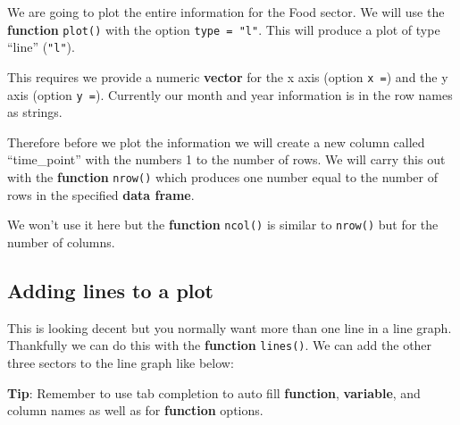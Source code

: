 \documentclass[]{book}
\newenvironment{Shaded}{\begin{snugshade}}{\end{snugshade}}
\newcommand{\KeywordTok}[1]{\textcolor[rgb]{0.13,0.29,0.53}{\textbf{#1}}}
\newcommand{\DataTypeTok}[1]{\textcolor[rgb]{0.13,0.29,0.53}{#1}}
\newcommand{\DecValTok}[1]{\textcolor[rgb]{0.00,0.00,0.81}{#1}}
\newcommand{\StringTok}[1]{\textcolor[rgb]{0.31,0.60,0.02}{#1}}
\newcommand{\CommentTok}[1]{\textcolor[rgb]{0.56,0.35,0.01}{\textit{#1}}}
\newcommand{\OperatorTok}[1]{\textcolor[rgb]{0.81,0.36,0.00}{\textbf{#1}}}
\newcommand{\NormalTok}[1]{#1}
\begin{document}
We are going to plot the entire information for the Food sector. We will
use the \textbf{function} \texttt{plot()} with the option
\texttt{type\ =\ "l"}. This will produce a plot of type ``line''
(\texttt{"l"}).

This requires we provide a numeric \textbf{vector} for the x axis
(option \texttt{x\ =}) and the y axis (option \texttt{y\ =}). Currently
our month and year information is in the row names as strings.

Therefore before we plot the information we will create a new column
called ``time\_point'' with the numbers 1 to the number of rows. We will
carry this out with the \textbf{function} \texttt{nrow()} which produces
one number equal to the number of rows in the specified \textbf{data
frame}.

We won't use it here but the \textbf{function} \texttt{ncol()} is
similar to \texttt{nrow()} but for the number of columns.

\begin{Shaded}
\end{Shaded}

\subsection{Adding lines to a plot}\label{adding-lines-to-a-plot}

This is looking decent but you normally want more than one line in a
line graph. Thankfully we can do this with the \textbf{function}
\texttt{lines()}. We can add the other three sectors to the line graph
like below:

\textbf{Tip}: Remember to use tab completion to auto fill
\textbf{function}, \textbf{variable}, and column names as well as for
\textbf{function} options.

\begin{Shaded}
\end{Shaded}
\end{document}
